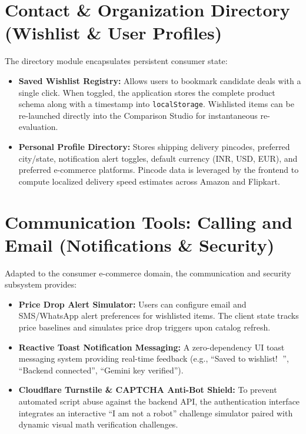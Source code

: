 \documentclass[12pt,a4paper,oneside]{report}
\begin{document}
\section{Contact \& Organization Directory (Wishlist \& User Profiles)}
The directory module encapsulates persistent consumer state:
\begin{itemize}
    \item \textbf{Saved Wishlist Registry:} Allows users to bookmark candidate deals with a single click. When toggled, the application stores the complete product schema along with a timestamp into \texttt{localStorage}. Wishlisted items can be re-launched directly into the Comparison Studio for instantaneous re-evaluation.
    \item \textbf{Personal Profile Directory:} Stores shipping delivery pincodes, preferred city/state, notification alert toggles, default currency (INR, USD, EUR), and preferred e-commerce platforms. Pincode data is leveraged by the frontend to compute localized delivery speed estimates across Amazon and Flipkart.
\end{itemize}

\section{Communication Tools: Calling and Email (Notifications \& Security)}
Adapted to the consumer e-commerce domain, the communication and security subsystem provides:
\begin{itemize}
    \item \textbf{Price Drop Alert Simulator:} Users can configure email and SMS/WhatsApp alert preferences for wishlisted items. The client state tracks price baselines and simulates price drop triggers upon catalog refresh.
    \item \textbf{Reactive Toast Notification Messaging:} A zero-dependency UI toast messaging system providing real-time feedback (e.g., ``Saved to wishlist! 💜'', ``Backend connected'', ``Gemini key verified'').
    \item \textbf{Cloudflare Turnstile \& CAPTCHA Anti-Bot Shield:} To prevent automated script abuse against the backend API, the authentication interface integrates an interactive ``I am not a robot'' challenge simulator paired with dynamic visual math verification challenges.
\end{itemize}

\end{document}
